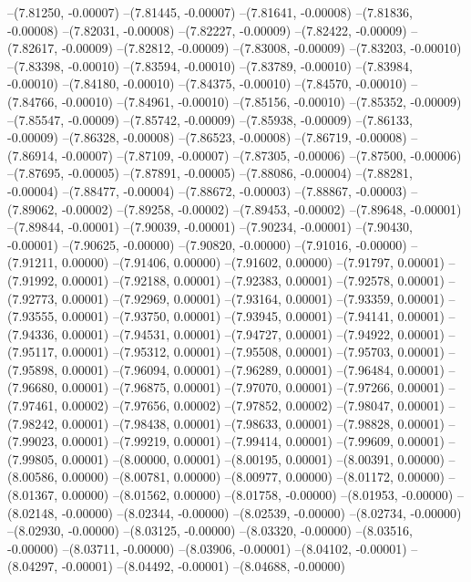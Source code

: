 --(7.81250, -0.00007)
--(7.81445, -0.00007)
--(7.81641, -0.00008)
--(7.81836, -0.00008)
--(7.82031, -0.00008)
--(7.82227, -0.00009)
--(7.82422, -0.00009)
--(7.82617, -0.00009)
--(7.82812, -0.00009)
--(7.83008, -0.00009)
--(7.83203, -0.00010)
--(7.83398, -0.00010)
--(7.83594, -0.00010)
--(7.83789, -0.00010)
--(7.83984, -0.00010)
--(7.84180, -0.00010)
--(7.84375, -0.00010)
--(7.84570, -0.00010)
--(7.84766, -0.00010)
--(7.84961, -0.00010)
--(7.85156, -0.00010)
--(7.85352, -0.00009)
--(7.85547, -0.00009)
--(7.85742, -0.00009)
--(7.85938, -0.00009)
--(7.86133, -0.00009)
--(7.86328, -0.00008)
--(7.86523, -0.00008)
--(7.86719, -0.00008)
--(7.86914, -0.00007)
--(7.87109, -0.00007)
--(7.87305, -0.00006)
--(7.87500, -0.00006)
--(7.87695, -0.00005)
--(7.87891, -0.00005)
--(7.88086, -0.00004)
--(7.88281, -0.00004)
--(7.88477, -0.00004)
--(7.88672, -0.00003)
--(7.88867, -0.00003)
--(7.89062, -0.00002)
--(7.89258, -0.00002)
--(7.89453, -0.00002)
--(7.89648, -0.00001)
--(7.89844, -0.00001)
--(7.90039, -0.00001)
--(7.90234, -0.00001)
--(7.90430, -0.00001)
--(7.90625, -0.00000)
--(7.90820, -0.00000)
--(7.91016, -0.00000)
--(7.91211, 0.00000)
--(7.91406, 0.00000)
--(7.91602, 0.00000)
--(7.91797, 0.00001)
--(7.91992, 0.00001)
--(7.92188, 0.00001)
--(7.92383, 0.00001)
--(7.92578, 0.00001)
--(7.92773, 0.00001)
--(7.92969, 0.00001)
--(7.93164, 0.00001)
--(7.93359, 0.00001)
--(7.93555, 0.00001)
--(7.93750, 0.00001)
--(7.93945, 0.00001)
--(7.94141, 0.00001)
--(7.94336, 0.00001)
--(7.94531, 0.00001)
--(7.94727, 0.00001)
--(7.94922, 0.00001)
--(7.95117, 0.00001)
--(7.95312, 0.00001)
--(7.95508, 0.00001)
--(7.95703, 0.00001)
--(7.95898, 0.00001)
--(7.96094, 0.00001)
--(7.96289, 0.00001)
--(7.96484, 0.00001)
--(7.96680, 0.00001)
--(7.96875, 0.00001)
--(7.97070, 0.00001)
--(7.97266, 0.00001)
--(7.97461, 0.00002)
--(7.97656, 0.00002)
--(7.97852, 0.00002)
--(7.98047, 0.00001)
--(7.98242, 0.00001)
--(7.98438, 0.00001)
--(7.98633, 0.00001)
--(7.98828, 0.00001)
--(7.99023, 0.00001)
--(7.99219, 0.00001)
--(7.99414, 0.00001)
--(7.99609, 0.00001)
--(7.99805, 0.00001)
--(8.00000, 0.00001)
--(8.00195, 0.00001)
--(8.00391, 0.00000)
--(8.00586, 0.00000)
--(8.00781, 0.00000)
--(8.00977, 0.00000)
--(8.01172, 0.00000)
--(8.01367, 0.00000)
--(8.01562, 0.00000)
--(8.01758, -0.00000)
--(8.01953, -0.00000)
--(8.02148, -0.00000)
--(8.02344, -0.00000)
--(8.02539, -0.00000)
--(8.02734, -0.00000)
--(8.02930, -0.00000)
--(8.03125, -0.00000)
--(8.03320, -0.00000)
--(8.03516, -0.00000)
--(8.03711, -0.00000)
--(8.03906, -0.00001)
--(8.04102, -0.00001)
--(8.04297, -0.00001)
--(8.04492, -0.00001)
--(8.04688, -0.00000)
